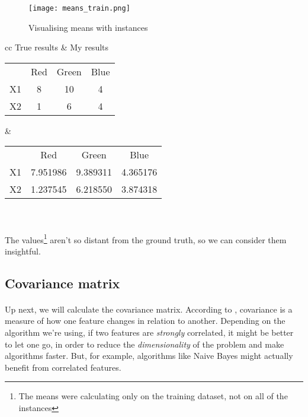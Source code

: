 \begin{figure}[H]
    \centering
    \texttt{[image: means\_train.png]}
    \caption{Visualising means with instances}
    \label{}
\end{figure}

\clearpage

\begin{center}
    \begin{tabular}{ cc }   %
        True results & My results \\  
        \begin{tabular}{ |c|c|c|c| } 
        \hline
        & Red & Green & Blue\\
        X1 & 8 & 10 & 4 \\
        X2 & 1 & 6 & 4 \\
        \hline
        \end{tabular} &  %
        \begin{tabular}{ |c|c|c|c| } 
        \hline
        & Red & Green & Blue\\
        X1 & 7.951986 & 9.389311 & 4.365176 \\
        X2 & 1.237545 & 6.218550 & 3.874318 \\
        \hline
        \end{tabular} \\
    \end{tabular}
\end{center}

\paragraph{}
The values\footnote{The means were calculating only on the training dataset, not on all of the instances} aren't so distant from the ground truth, so we can consider them insightful.

\subsection{Covariance matrix}

\paragraph{}
Up next, we will calculate the covariance matrix.
According to \cite{covariance}, covariance is a measure of how one feature changes in relation to another.
Depending on the algorithm we're using, if two features are \emph{strongly} correlated, it might be better to let one go, in order to reduce the \emph{dimensionality} of the problem and make algorithms faster.
But, for example, algorithms like Naive Bayes might actually benefit from correlated features.

